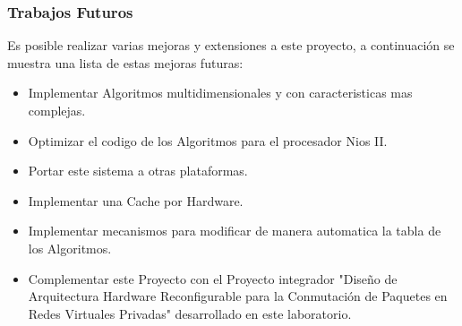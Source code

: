 \subsubsection{Trabajos Futuros}

Es posible realizar varias mejoras y extensiones a este proyecto, a continuación se muestra una lista de estas mejoras futuras:

\begin{itemize}
	\item Implementar Algoritmos multidimensionales y con caracteristicas mas complejas.
	\item Optimizar el codigo de los Algoritmos para el procesador Nios II. 
	\item Portar este sistema a otras plataformas.
	\item Implementar una Cache por Hardware.
	\item Implementar mecanismos para modificar de manera automatica la tabla de los Algoritmos.
	\item Complementar este Proyecto con el Proyecto integrador "Diseño de Arquitectura Hardware Reconfigurable para la Conmutación de Paquetes en Redes Virtuales Privadas"\cite{spaz} desarrollado en este laboratorio.
\end{itemize}






